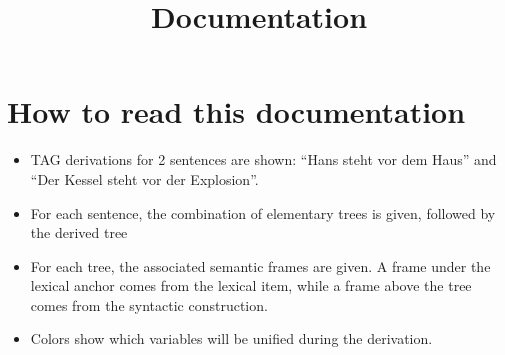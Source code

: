 \documentclass{article}
\title{Documentation}
\begin{document}
\maketitle

\section{How to read this documentation}
\begin{itemize}
\item TAG derivations for 2 sentences are shown: ``Hans steht vor dem Haus'' and ``Der Kessel steht vor der Explosion''.
\item For each sentence, the combination of elementary trees is given, followed by the derived tree
\item For each tree, the associated semantic frames are given. A frame under the lexical anchor comes from the lexical item, while a frame above the tree comes from the syntactic construction.
\item Colors show which variables will be unified during the derivation.
\end{itemize}
\end{document}
